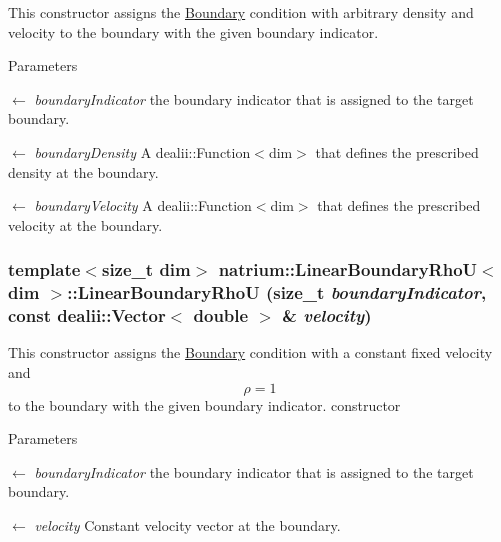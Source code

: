 This constructor assigns the \hyperlink{classnatrium_1_1Boundary}{Boundary} condition with arbitrary density and velocity to the boundary with the given boundary indicator. 
\begin{DoxyParams}{Parameters}
\item[\mbox{$\leftarrow$} {\em boundaryIndicator}]the boundary indicator that is assigned to the target boundary. \item[\mbox{$\leftarrow$} {\em boundaryDensity}]A dealii::Function$<$dim$>$ that defines the prescribed density at the boundary. \item[\mbox{$\leftarrow$} {\em boundaryVelocity}]A dealii::Function$<$dim$>$ that defines the prescribed velocity at the boundary. \end{DoxyParams}
\hypertarget{classnatrium_1_1LinearBoundaryRhoU_a1c95f6068da74cc69e58611d82f2eee4}{
\subsubsection[{LinearBoundaryRhoU}]{\setlength{\rightskip}{0pt plus 5cm}template$<$size\_\-t dim$>$ {\bf natrium::LinearBoundaryRhoU}$<$ dim $>$::{\bf LinearBoundaryRhoU} (size\_\-t {\em boundaryIndicator}, \/  const dealii::Vector$<$ double $>$ \& {\em velocity})}}
\label{classnatrium_1_1LinearBoundaryRhoU_a1c95f6068da74cc69e58611d82f2eee4}


This constructor assigns the \hyperlink{classnatrium_1_1Boundary}{Boundary} condition with a constant fixed velocity and \[ \rho = 1 \] to the boundary with the given boundary indicator. constructor


\begin{DoxyParams}{Parameters}
\item[\mbox{$\leftarrow$} {\em boundaryIndicator}]the boundary indicator that is assigned to the target boundary. \item[\mbox{$\leftarrow$} {\em velocity}]Constant velocity vector at the boundary. \end{DoxyParams}


